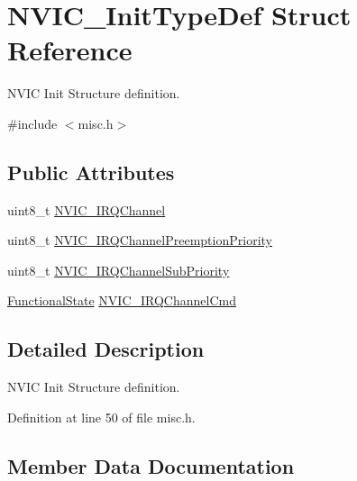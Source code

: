 \hypertarget{struct_n_v_i_c___init_type_def}{}\section{N\+V\+I\+C\+\_\+\+Init\+Type\+Def Struct Reference}
\label{struct_n_v_i_c___init_type_def}


N\+V\+IC Init Structure definition.  




{\ttfamily \#include $<$misc.\+h$>$}

\subsection*{Public Attributes}
\begin{DoxyCompactItemize}
\item 
uint8\+\_\+t \hyperlink{struct_n_v_i_c___init_type_def_afa04cf6e559bb690bdd9fcb7e3d93dcf}{N\+V\+I\+C\+\_\+\+I\+R\+Q\+Channel}
\item 
uint8\+\_\+t \hyperlink{struct_n_v_i_c___init_type_def_aa3fe262c30188404a6e31f922c5ae513}{N\+V\+I\+C\+\_\+\+I\+R\+Q\+Channel\+Preemption\+Priority}
\item 
uint8\+\_\+t \hyperlink{struct_n_v_i_c___init_type_def_aecc22a002244e3f1f9448dbe46c1db4b}{N\+V\+I\+C\+\_\+\+I\+R\+Q\+Channel\+Sub\+Priority}
\item 
\hyperlink{group___exported__types_gac9a7e9a35d2513ec15c3b537aaa4fba1}{Functional\+State} \hyperlink{struct_n_v_i_c___init_type_def_acb23fabb995fa4980c768825f12f5815}{N\+V\+I\+C\+\_\+\+I\+R\+Q\+Channel\+Cmd}
\end{DoxyCompactItemize}


\subsection{Detailed Description}
N\+V\+IC Init Structure definition. 

Definition at line 50 of file misc.\+h.



\subsection{Member Data Documentation}
\mbox{\label{struct_n_v_i_c___init_type_def_afa04cf6e559bb690bdd9fcb7e3d93dcf}} 

